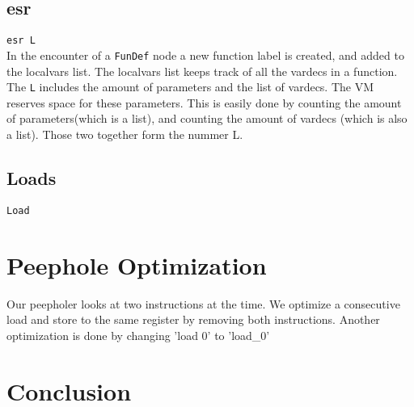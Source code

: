 \documentclass[a4paper]{article}
\begin{document}
\subsection{esr}
\texttt{esr L} \\
In the encounter of a \texttt{FunDef} node a new function label is created, and
added to the localvars list. The localvars list keeps track of all the vardecs
in a function. The \texttt{L} includes the amount of parameters and the list of
vardecs. The VM reserves space for these parameters. This is easily done by
counting the amount of parameters(which is a list), and counting the amount of
vardecs (which is also a list). Those two together form the nummer L.

\subsection{Loads}
\texttt{Load}


\section{Peephole Optimization}
Our peepholer looks at two instructions at the time. We optimize a consecutive
load and store to the same register by removing both instructions.
Another optimization is done by changing 'load 0' to 'load\_0'



\section{Conclusion}





\end{document}
